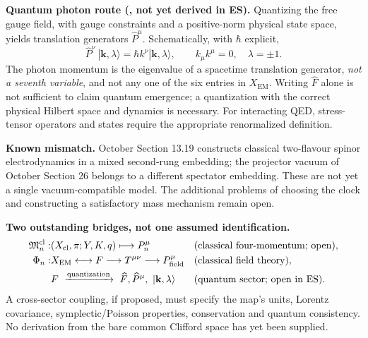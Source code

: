 \documentclass[10.5pt,a4paper]{article}
\newcommand{\Xcl}{X_{\mathrm{cl}}}
\newcommand{\Xem}{X_{\mathrm{EM}}}
\newcommand{\Fhat}{\widehat F}
\newcommand{\st}[1]{\textcolor{muted}{\small\sffamily [#1]}}
\begin{document}
\textbf{Quantum photon route (\st{Standard}, not yet derived in ES).} Quantizing the free gauge field, with gauge constraints and a positive-norm physical state space, yields translation generators $\widehat P^\mu$. Schematically, with $\hbar$ explicit,
\begin{equation}\label{eq:quantP}
  \widehat P^\nu\ |\mathbf k,\lambda\rangle
  =\hbar k^\nu|\mathbf k,\lambda\rangle,
  \qquad k_\mu k^\mu=0,\quad\lambda=\pm1.
\end{equation}
The photon momentum is the eigenvalue of a spacetime translation generator, \emph{not a seventh variable}, and not any one of the six entries in $\Xem$. Writing $\Fhat$ alone is not sufficient to claim quantum emergence; a quantization with the correct physical Hilbert space and dynamics is necessary. For interacting QED, stress-tensor operators and states require the appropriate renormalized definition.

\textbf{Known mismatch.} October Section 13.19 constructs classical two-flavour spinor electrodynamics in a mixed second-rung embedding; the projector vacuum of October Section 26 belongs to a different spectator embedding. These are not yet a single vacuum-compatible model. The additional problems of choosing the clock and constructing a satisfactory mass mechanism remain open.

\begin{resultbox}
\textbf{Two outstanding bridges, not one assumed identification.}
\begin{align*}
 \mathfrak M_n^{\rm cl}:&(\Xcl,\pi;Y,K,q)\longmapsto P_n^\mu
  &&\text{(classical four-momentum; open)},\\
 \Phi_n:&\Xem\longleftrightarrow F\longrightarrow T^{\mu\nu}
  \longrightarrow P^\mu_{\rm field}
  &&\text{(classical field theory)},\\
 &F\ \xrightarrow{\text{quantization}}\ \Fhat,
 \widehat P^\mu,\ |\mathbf k,\lambda\rangle
  &&\text{(quantum sector; open in ES)}.
\end{align*}
A cross-sector coupling, if proposed, must specify the map's units, Lorentz covariance, symplectic/Poisson properties, conservation and quantum consistency. No derivation from the bare common Clifford space has yet been supplied.
\end{resultbox}
\end{document}
